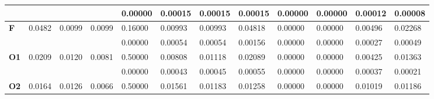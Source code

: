 \documentclass[]{scrartcl}
\begin{document}
\begin{table}[]
\begin{tabular}{|l|l|l|l|l|l|l|l|l|l|l|l|}
		\textbf{}                           &                                 &                                 &                                 & 0.00000                           & 0.00015                           & 0.00015                           & 0.00015                           & 0.00000                           & 0.00000                           & 0.00012                           & 0.00008                           \\ \hline
		\textbf{F}                          & 0.0482                          & 0.0099                          & 0.0099                          & 0.16000                           & 0.00993                           & 0.00993                           & 0.04818                           & 0.00000                           & 0.00000                           & 0.00496                           & 0.02268                           \\ \hline
		\textbf{}                           &                                 &                                 &                                 & 0.00000                           & 0.00054                           & 0.00054                           & 0.00156                           & 0.00000                           & 0.00000                           & 0.00027                           & 0.00049                           \\ \hline
		\textbf{O1}                         & 0.0209                          & 0.0120                          & 0.0081                          & 0.50000                           & 0.00808                           & 0.01118                           & 0.02089                           & 0.00000                           & 0.00000                           & 0.00425                           & 0.01363                           \\ \hline
		&                                 &                                 &                                 & 0.00000                           & 0.00043                           & 0.00045                           & 0.00055                           & 0.00000                           & 0.00000                           & 0.00037                           & 0.00021                           \\ \hline
		\textbf{O2}                         & 0.0164                          & 0.0126                          & 0.0066                          & 0.50000                           & 0.01561                           & 0.01183                           & 0.01258                           & 0.00000                           & 0.00000                           & 0.01019                           & 0.01186                           \\ \hline

\end{tabular}
\end{table}
\end{document}
